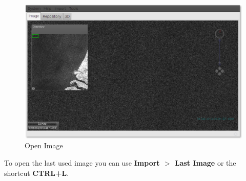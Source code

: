 \documentclass[12pt,a4paper,final]{report}
\begin{document}
\begin{figure}[H]
 \centering
 \includegraphics[scale=0.45,keepaspectratio=true]{./images/ImportImage4.png}
 \caption{Open Image}
\end{figure}

To open the last used image you can use \textbf{Import $>$ Last Image} or the shortcut \textbf{CTRL+L}.
\end{document}
